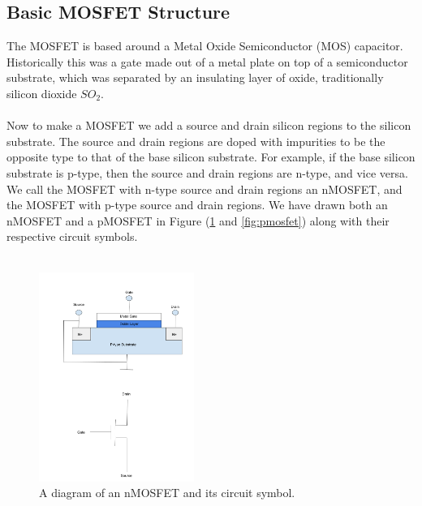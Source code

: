\documentclass[
  reprint,
  amsmath,amssymb,
  aps
]{revtex4-1}
\begin{document}
\subsection{\label{sec:level2}Basic MOSFET Structure}
The MOSFET is based around a Metal Oxide Semiconductor (MOS) capacitor. Historically this 
was a gate made out of a metal plate on top of a semiconductor substrate, which was separated by an insulating layer of oxide, traditionally silicon dioxide $SO_{2}$.\\\\
Now to make a MOSFET we add a source and drain silicon regions to the silicon substrate. The source and drain regions are doped with impurities to
be the opposite type to that of the base silicon substrate. For example, if the base silicon substrate is p-type, then the source and drain regions
are n-type, and vice versa. We call the MOSFET with n-type source and drain regions an nMOSFET, and the MOSFET with p-type source and drain regions. We have 
drawn both an nMOSFET and a pMOSFET in Figure (\ref{fig:nmosfet} and \ref{fig:pmosfet}) along with their respective circuit symbols.\\\\
\begin{figure}[H]
    \centering
        \includegraphics[width=0.45\textwidth]{nmosfet.png}
    \caption{A diagram of an nMOSFET and its circuit symbol.}
    \label{fig:nmosfet}
\end{figure}
\end{document}
